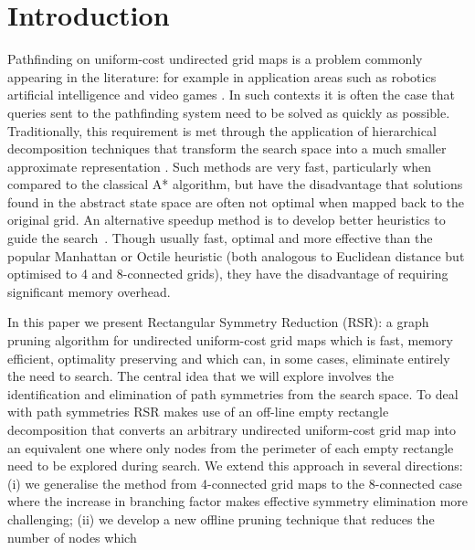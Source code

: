 \section{Introduction}
\label{sec:introduction}

Pathfinding on uniform-cost undirected grid maps is a problem commonly appearing in
the literature: for example in application areas such as robotics \cite{lee09}
artificial intelligence \cite{wang09} and video games \cite{davis00,sturtevant10}.  
In such contexts it is often the
case that queries sent to the pathfinding system need to be solved as quickly as
possible.  Traditionally, this requirement is met through the application of
hierarchical decomposition techniques that transform the search space into a
much smaller approximate representation \cite{botea04,sturtevant10}.
Such methods are very fast, particularly when compared to the classical A*
algorithm, but have the disadvantage that solutions found in the abstract state
space are often not optimal when mapped back to the original grid.  An
alternative speedup method is to develop better heuristics to guide the
search~\cite{bjornsson06,sturtevant09,goldenberg10}.  Though usually
fast, optimal and more effective than the popular Manhattan or Octile heuristic (both
analogous to Euclidean distance but optimised to 4 and 8-connected grids), they
have the disadvantage of requiring significant memory overhead.
\par
In this paper we present Rectangular Symmetry Reduction (RSR): a graph pruning
algorithm for undirected uniform-cost grid maps which is fast, memory efficient,
optimality preserving and which can, in some cases, eliminate entirely the need
to search.  The central idea that we will explore involves the identification
and elimination of path symmetries from the search space. 
To deal with path symmetries RSR makes use of an off-line
empty rectangle decomposition \cite{harabor10} that converts an arbitrary
undirected uniform-cost grid map into an equivalent one where only nodes
from the perimeter of each empty rectangle need to be explored during search.
We extend this approach in several directions: (i) we generalise the method
from 4-connected grid maps to the 8-connected case where the increase in
branching factor makes effective symmetry elimination more challenging; (ii) we
develop a new offline pruning technique that reduces the number of nodes which
